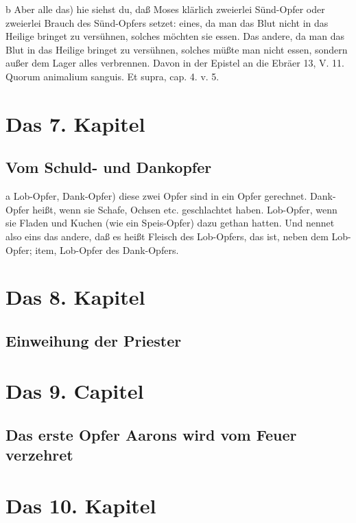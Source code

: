 b Aber alle das) hie siehst du, daß Moses klärlich zweierlei Sünd-Opfer oder zweierlei Brauch des Sünd-Opfers setzet: eines, da man das Blut nicht in das Heilige bringet zu versühnen, solches möchten sie essen. Das andere, da man das Blut in das Heilige bringet zu versühnen, solches müßte man nicht essen, sondern außer dem Lager alles verbrennen. Davon in der Epistel an die Ebräer 13, V. 11. Quorum animalium sanguis. Et supra, cap. 4. v. 5.

\chapter{Das 7. Kapitel}

\section{Vom Schuld- und Dankopfer}

a Lob-Opfer, Dank-Opfer) diese zwei Opfer sind in ein Opfer gerechnet. Dank-Opfer heißt, wenn sie Schafe, Ochsen etc. geschlachtet haben. Lob-Opfer, wenn sie Fladen und Kuchen (wie ein Speis-Opfer) dazu gethan hatten. Und nennet also eins das andere, daß es heißt Fleisch des Lob-Opfers, das ist, neben dem Lob-Opfer; item, Lob-Opfer des Dank-Opfers.

\chapter{Das 8. Kapitel}

\section{Einweihung der Priester}

\chapter{Das 9. Capitel}

\section{Das erste Opfer Aarons wird vom Feuer verzehret}

\chapter{Das 10. Kapitel}

